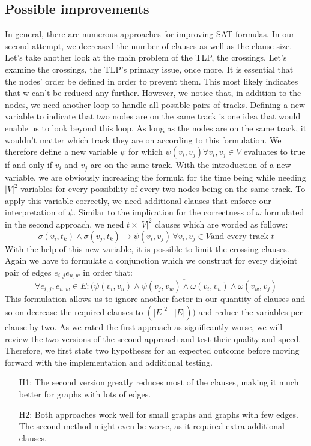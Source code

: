 \documentclass[bachelor, english]{algothesis}
\begin{document}
\subsection{Possible improvements}
In general, there are numerous approaches for improving SAT formulas. In our second attempt, we decreased the number of clauses as well as the clause size. Let's take another look at the main problem of the TLP, the crossings. Let's examine the crossings, the TLP's primary issue, once more. It is essential that the nodes' order be defined in order to prevent them. This most likely indicates that w can't be reduced any further. However, we notice that, in addition to the nodes, we need another loop to handle all possible pairs of tracks. Defining a new variable to indicate that two nodes are on the same track is one idea that would enable us to look beyond this loop. As long as the nodes are on the same track, it wouldn't matter which track they are on according to this formulation. We therefore define a new variable $\psi$ for which $\psi(v_i,v_j) \forall v_i,v_j \in V$ evaluates to true if and only if $v_i$ and $v_j$ are on the same track. With the introduction of a new variable, we are obviously increasing the formula for the time being while needing ${\vert V \vert}^2$ variables for every possibility of every two nodes being on the same track. To apply this variable correctly, we need additional clauses that enforce our interpretation of $\psi$. Similar to the implication for the correctness of $\omega$ formulated in the second approach, we need $t \times {\vert V \vert}^2$ clauses which are worded as follows:
    $$ \sigma(v_i,t_k) \land \sigma(v_j,t_k)\rightarrow \psi(v_i,v_j) \, \forall v_i,v_j \in V \text{and every track }t$$
With the help of this new variable, it is possible to limit the crossing clauses. Again we have to formulate a conjunction which we construct for every disjoint pair of edges $e_{i,j} e_{u,w}$ in order that:
    $$ \forall e_{i,j}, e_{u,w} \in E : \overline{(\psi(v_i,v_u) \land \psi(v_j,v_w) \land   \omega(v_i,v_u) \land \omega(v_w,v_j)}$$
This formulation allows us to ignore another factor in our quantity of clauses and so on decrease the required clauses to $ (\vert E \vert^2 - \vert E \vert))$ and reduce the variables per clause by two. As we rated the first approach as significantly worse, we will review the two versions of the second approach and test their quality and speed. Therefore, we first state two hypotheses  for an expected outcome before moving forward with the implementation and additional testing.
\begin{enumerate}
    \item[H1:] The second version greatly reduces most of the clauses, making it much better for graphs with lots of edges.
    \item[H2:] Both approaches work well for small graphs and graphs with few edges. The second method might even be worse, as it required extra additional clauses.
\end{enumerate}
\end{document}

